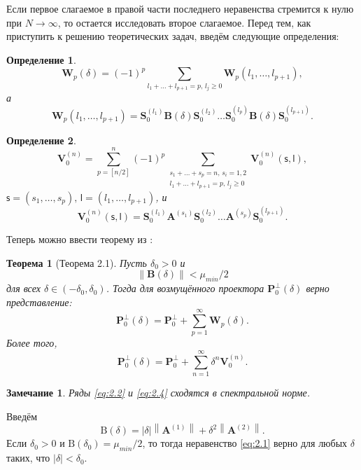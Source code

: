 \documentclass[specialist,
               substylefile = spbu_report.rtx,
               subf,href,colorlinks=true, 12pt]{disser}
\newcommand\norm[1]{\left\|#1\right\|}
\newtheorem{theorem}{Теорема}
\newtheorem{remark}{Замечание}
\newtheorem{definition}{Определение}
\begin{document}
Если первое слагаемое в правой части последнего неравенства  стремится к нулю при $N \rightarrow \infty$, то остается исследовать второе слагаемое. Перед тем, как приступить к решению теоретических задач, введём следующие определения:
\begin{definition}
\begin{equation}
	\mathbf{W}_p(\delta) = (-1)^p\sum\limits_{l_1+\dots+l_{p+1}=p,\,l_j\geqslant0}\mathbf{W}_p(l_1,\dots,l_{p+1}),\label{eq:w}
\end{equation}
а
\begin{equation*}
	\mathbf{W}_p(l_1,\dots,l_{p+1}) = \mathbf{S}_0^{(l_1)}\mathbf{B}(\delta)\mathbf{S}_0^{(l_2)}\dots\mathbf{S}_0^{(l_p)}\mathbf{B}(\delta)\mathbf{S}_0^{(l_{p+1})}.
\end{equation*}
\end{definition}
\begin{definition}
	\begin{equation*}
	\mathbf{V}_0^{(n)}=\sum\limits_{p=[n/2]}^n(-1)^p\sum_{\substack{
			s_1+\dots+s_p=n,\,s_i=1,2\\
			l_1+\dots+l_{p+1}=p,\,l_j\geqslant0}}
	\mathbf{V}_0^{(n)}(\mathsf{s},\mathsf{l}),
\end{equation*}
$\mathsf{s} = (s_1,\dots,s_p),\,\mathsf{l}=(l_1,\dots,l_{p+1})$, и
\begin{equation*}
	\mathbf{V}_0^{(n)}(\mathsf{s}, \mathsf{l})=\mathbf{S}_0^{(l_1)}\mathbf{A}^{(s_1)}\mathbf{S}_0^{(l_2)}\dots\mathbf{A}^{(s_p)}\mathbf{S}_0^{(l_{p+1})}.
\end{equation*}
\end{definition}
Теперь можно ввести теорему из \cite{Nekrutkin10}:
\begin{theorem}[Теорема 2.1]\label{th:2.1}\rm
	\emph{Пусть} $\delta_0>0$ и
	\begin{equation}\label{eq:2.1}
		\norm{\mathbf{B}(\delta)}<\mu_{min}/2
	\end{equation}
	\emph{для всех} $\delta\in(-\delta_0,\delta_0)$. \emph{Тогда для возмущённого проектора} $\mathbf{P}_0^\bot(\delta)$ \emph{верно представление:}
	\begin{equation}\label{eq:2.2}
		\mathbf{P}_0^\bot(\delta)=\mathbf{P}_0^\bot + \sum_{p=1}^\infty\mathbf{W}_p(\delta).
	\end{equation}
	\emph{Более того,}
	\begin{equation}\label{eq:2.4}
		\mathbf{P}_0^\bot(\delta) = \mathbf{P}_0^\bot + \sum_{n=1}^\infty\delta^n\mathbf{V}_0^{(n)}.
	\end{equation}
\end{theorem}
\begin{remark}
Ряды	\eqref{eq:2.2} и \eqref{eq:2.4} сходятся в спектральной норме.
\end{remark}
Введём
\begin{equation*}
	\mathrm{B}(\delta) = |\delta|\norm{\mathbf{A}^{(1)}}+\delta^2\norm{\mathbf{A}^{(2)}}.
\end{equation*}
Если $\delta_0>0$ и $\mathrm{B}(\delta_0)=\mu_{min}/2$, то тогда неравенство \eqref{eq:2.1} верно для любых $\delta$ таких, что $|\delta|<\delta_0$.
\end{document}
